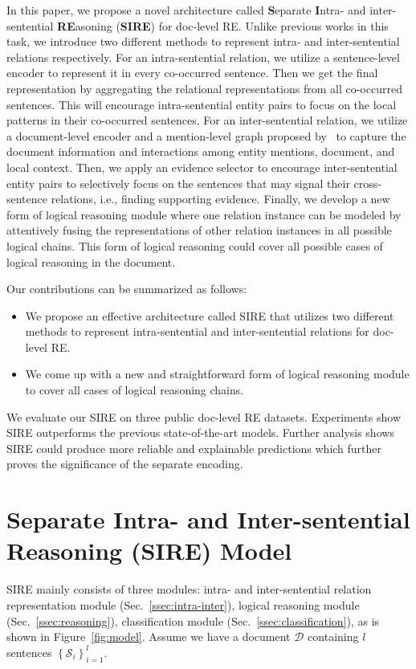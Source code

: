 \documentclass[11pt,a4paper]{article}
\begin{document}
In this paper, we propose a novel architecture called \textbf{S}eparate \textbf{I}ntra- and inter-sentential \textbf{RE}asoning (\textbf{SIRE}) for doc-level RE. Unlike previous works in this task, we introduce two different methods to represent intra- and inter-sentential relations respectively. 
For an intra-sentential relation, we utilize a sentence-level encoder to represent it in every co-occurred sentence. Then we get the final representation by aggregating the relational representations from all co-occurred sentences. This will encourage intra-sentential entity pairs to focus on the local patterns in their co-occurred sentences. 
For an inter-sentential relation, we utilize a document-level encoder and a mention-level graph proposed by~\citet{GAIN} to capture the document information and interactions among entity mentions, document, and local context. Then, we apply an evidence selector to encourage inter-sentential entity pairs to selectively focus on the sentences that may signal their cross-sentence relations, i.e., finding supporting evidence.
Finally, we develop a new form of logical reasoning module where one relation instance can be modeled by attentively fusing the representations of other relation instances in all possible logical chains. This form of logical reasoning could cover all possible cases of logical reasoning in the document.

Our contributions can be summarized as follows:
\begin{itemize}
    \item We propose an effective architecture called SIRE that utilizes two different methods to represent intra-sentential and inter-sentential relations for doc-level RE.
    \item We come up with a new and straightforward form of logical reasoning module to cover all cases of logical reasoning chains.
\end{itemize}

We evaluate our SIRE on three public doc-level RE datasets. Experiments show SIRE outperforms the previous state-of-the-art models. Further analysis shows SIRE could produce more reliable and explainable predictions which further proves the significance of the separate encoding.

 \section{Separate Intra- and Inter-sentential Reasoning (SIRE) Model}

SIRE mainly consists of three modules: intra- and inter-sentential relation representation module (Sec.~\ref{ssec:intra-inter}), logical reasoning module (Sec.~\ref{ssec:reasoning}), classification module (Sec.~\ref{ssec:classification}), as is shown in Figure~\ref{fig:model}. Assume we have a document $\mathcal{D}$ containing $l$ sentences $\left\{\mathcal{S}_{i}\right\}^{l}_{i=1}$. 
\end{document}

